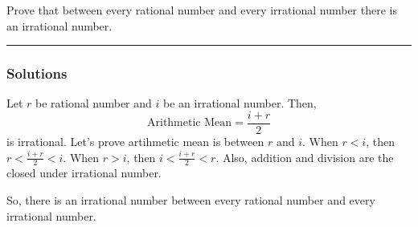 \newpage
\begin{question}
Prove that between every rational number and every irrational number there is an irrational number.
\end{question}

\par\noindent\rule{\textwidth}{0.5pt}

\subsubsection*{Solutions}

Let $r$ be rational number and $i$ be an irrational number. Then, $$\text{Arithmetic Mean} = \frac {i + r} {2}$$ is irrational. Let's prove artihmetic mean is between $r$ and $i$. When $r < i$, then $\displaystyle r < \frac {i + r} {2} < i$. When $r > i$, then $\displaystyle i < \frac {i + r} {2} < r$. Also, addition and division are the closed under irrational number.

\bigskip

So, there is an irrational number between every rational number and every irrational number.